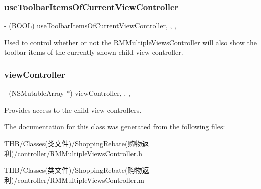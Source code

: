 \subsubsection{\texorpdfstring{use\+Toolbar\+Items\+Of\+Current\+View\+Controller}{useToolbarItemsOfCurrentViewController}}
{\footnotesize\ttfamily -\/ (B\+O\+OL) use\+Toolbar\+Items\+Of\+Current\+View\+Controller\hspace{0.3cm}{\ttfamily [read]}, {\ttfamily [write]}, {\ttfamily [nonatomic]}, {\ttfamily [assign]}}

Used to control whether or not the {\ttfamily \mbox{\hyperlink{interface_r_m_multiple_views_controller}{R\+M\+Multiple\+Views\+Controller}}} will also show the toolbar items of the currently shown child view controller. \mbox{\label{interface_r_m_multiple_views_controller_af2450dcbf3350a9b4657731ded6f1caf}} 
\subsubsection{\texorpdfstring{view\+Controller}{viewController}}
{\footnotesize\ttfamily -\/ (N\+S\+Mutable\+Array $\ast$) view\+Controller\hspace{0.3cm}{\ttfamily [read]}, {\ttfamily [write]}, {\ttfamily [nonatomic]}, {\ttfamily [strong]}}

Provides access to the child view controllers. 

The documentation for this class was generated from the following files\+:\begin{DoxyCompactItemize}
\item 
T\+H\+B/\+Classes(类文件)/\+Shopping\+Rebate(购物返利)/controller/R\+M\+Multiple\+Views\+Controller.\+h\item 
T\+H\+B/\+Classes(类文件)/\+Shopping\+Rebate(购物返利)/controller/R\+M\+Multiple\+Views\+Controller.\+m\end{DoxyCompactItemize}
